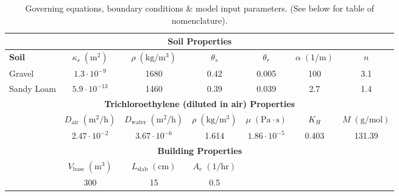 \documentclass[preprint,12pt]{elsarticle}
\begin{document}
\begin{table}
\begin{tabular}{l c c c c c c}
    \midrule
    \multicolumn{7}{c}{\textbf{Soil Properties}\cite{dan_capillary_2012,abreu_conceptual_2012,u.s._environmental_protection_agency_userss_2004}} \\
    \midrule
    \textbf{Soil} & \textbf{$\kappa_s \; \mathrm{(m^2)}$} & \textbf{$\rho \; \mathrm{(kg/m^3)}$} & \textbf{$\theta_s$} & \textbf{$\theta_r$} & \textbf{$\alpha \; \mathrm{(1/m)}$} & \textbf{$n$} \\
    Gravel & $1.3 \cdot 10^{-9}$ & 1680 & 0.42 & 0.005 & 100 & 3.1 \\
    Sandy Loam & $5.9 \cdot 10^{-13}$ & 1460 & 0.39 & 0.039 & 2.7 & 1.4 \\
    \midrule
    \multicolumn{7}{c}{\textbf{Trichloroethylene (diluted in air) Properties}\cite{abreu_conceptual_2012,u.s._environmental_protection_agency_userss_2004}} \\
    \midrule
     & \textbf{$D_\mathrm{air} \; \mathrm{(m^2/h)}$} & \textbf{$D_\mathrm{water} \; \mathrm{(m^2/h)}$} & \textbf{$\rho \; \mathrm{(kg/m^3)}$} & \textbf{$\mu \; \mathrm{(Pa \cdot s)}$} & \textbf{$K_H$} & \textbf{$M \; \mathrm{(g/mol)}$} \\
     & $2.47 \cdot 10^{-2}$ & $3.67 \cdot 10^{-6}$ & 1.614 & $1.86 \cdot 10^{-5}$ & 0.403 & 131.39 \\
    \midrule
    \multicolumn{7}{c}{\textbf{Building Properties}} \\
    \midrule
     & \textbf{$V_\mathrm{base} \; \mathrm{(m^3)}$} & \textbf{$L_\mathrm{slab} \; \mathrm{(cm)}$} & \textbf{$A_e \; \mathrm{(1/hr)}$} \\
     & 300 & 15 & 0.5 \\
    \bottomrule
  \end{tabular}
  \caption{Governing equations, boundary conditions \& model input parameters. (See below for table of nomenclature).}\label{tbl:eqns_bc_parameters}
\end{table}
\end{document}
